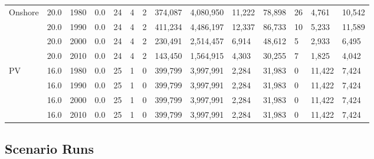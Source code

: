 \begin{table}[]
\begin{tabular}{|l|l|l|l|l|l|l|l|l|l|l|l|l|l|}
		\multirow{4}{*}{Onshore} & 20.0 & 1980 & 0.0 & 24 & 4 & 2 & 374,087 & 4,080,950 & 11,222 & 78,898 & 26 & 4,761 & 10,542 \\ \cline{2-14} 
		& 20.0 & 1990 & 0.0 & 24 & 4 & 2 & 411,234 & 4,486,197 & 12,337 & 86,733 & 10 & 5,233 & 11,589 \\ \cline{2-14} 
		& 20.0 & 2000 & 0.0 & 24 & 4 & 2 & 230,491 & 2,514,457 & 6,914 & 48,612 & 5 & 2,933 & 6,495 \\ \cline{2-14} 
		& 20.0 & 2010 & 0.0 & 24 & 4 & 2 & 143,450 & 1,564,915 & 4,303 & 30,255 & 7 & 1,825 & 4,042 \\ \hline
		\multirow{4}{*}{PV} & 16.0 & 1980 & 0.0 & 25 & 1 & 0 & 399,799 & 3,997,991 & 2,284 & 31,983 & 0 & 11,422 & 7,424 \\ \cline{2-14} 
		& 16.0 & 1990 & 0.0 & 25 & 1 & 0 & 399,799 & 3,997,991 & 2,284 & 31,983 & 0 & 11,422 & 7,424 \\ \cline{2-14} 
		& 16.0 & 2000 & 0.0 & 25 & 1 & 0 & 399,799 & 3,997,991 & 2,284 & 31,983 & 0 & 11,422 & 7,424 \\ \cline{2-14} 
		& 16.0 & 2010 & 0.0 & 25 & 1 & 0 & 399,799 & 3,997,991 & 2,284 & 31,983 & 0 & 11,422 & 7,424 \\ \hline
	\end{tabular}
	\label{table:historic_plant_costs}
\end{table}

\clearpage

\subsection{Scenario Runs}



